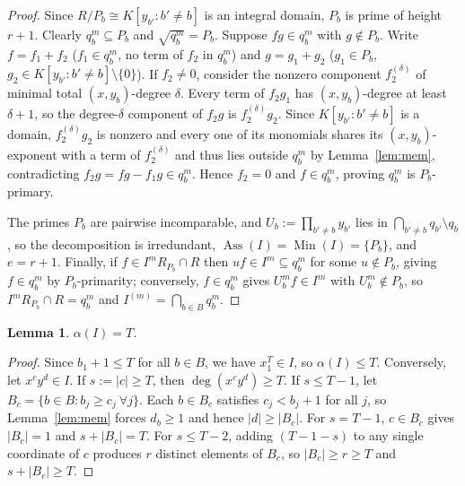 \documentclass[11pt]{article}
\newtheorem{lemma}[theorem]{Lemma}
\newcommand{\Ass}{\operatorname{Ass}}
\newcommand{\Min}{\operatorname{Min}}
\begin{document}
\begin{proof}
Since $R/P_b \cong K[y_{b'} : b' \ne b]$ is an integral domain, $P_b$ is prime of height $r + 1$. Clearly $q_b^m \subseteq P_b$ and $\sqrt{q_b^m} = P_b$. Suppose $fg \in q_b^m$ with $g \notin P_b$. Write $f = f_1 + f_2$ ($f_1 \in q_b^m$, no term of $f_2$ in $q_b^m$) and $g = g_1 + g_2$ ($g_1 \in P_b$, $g_2 \in K[y_{b'} : b' \ne b] \setminus \{0\}$). If $f_2 \ne 0$, consider the nonzero component $f_2^{(\delta)}$ of minimal total $(x, y_b)$-degree $\delta$. Every term of $f_2 g_1$ has $(x, y_b)$-degree at least $\delta + 1$, so the degree-$\delta$ component of $f_2 g$ is $f_2^{(\delta)} g_2$. Since $K[y_{b'} : b' \ne b]$ is a domain, $f_2^{(\delta)} g_2$ is nonzero and every one of its monomials shares its $(x, y_b)$-exponent with a term of $f_2^{(\delta)}$ and thus lies outside $q_b^m$ by Lemma~\ref{lem:mem}, contradicting $f_2 g = fg - f_1 g \in q_b^m$. Hence $f_2 = 0$ and $f \in q_b^m$, proving $q_b^m$ is $P_b$-primary.

The primes $P_b$ are pairwise incomparable, and $U_b := \prod_{b' \ne b} y_{b'}$ lies in $\bigcap_{b' \ne b} q_{b'} \setminus q_b$, so the decomposition is irredundant, $\Ass(I) = \Min(I) = \{P_b\}$, and $e = r + 1$. Finally, if $f \in I^m R_{P_b} \cap R$ then $uf \in I^m \subseteq q_b^m$ for some $u \notin P_b$, giving $f \in q_b^m$ by $P_b$-primarity; conversely, $f \in q_b^m$ gives $U_b^m f \in I^m$ with $U_b^m \notin P_b$, so $I^m R_{P_b} \cap R = q_b^m$ and $I^{(m)} = \bigcap_{b \in B} q_b^m$.
\end{proof}

\begin{lemma}\label{lem:alpha}
$\alpha(I) = T$.
\end{lemma}

\begin{proof}
Since $b_1 + 1 \le T$ for all $b \in B$, we have $x_1^T \in I$, so $\alpha(I) \le T$. Conversely, let $x^c y^d \in I$. If $s := |c| \ge T$, then $\deg(x^c y^d) \ge T$. If $s \le T - 1$, let $B_c = \{b \in B : b_j \ge c_j\ \forall j\}$. Each $b \in B_c$ satisfies $c_j < b_j + 1$ for all $j$, so Lemma~\ref{lem:mem} forces $d_b \ge 1$ and hence $|d| \ge |B_c|$. For $s = T - 1$, $c \in B_c$ gives $|B_c| = 1$ and $s + |B_c| = T$. For $s \le T - 2$, adding $(T - 1 - s)$ to any single coordinate of $c$ produces $r$ distinct elements of $B_c$, so $|B_c| \ge r \ge T$ and $s + |B_c| \ge T$.
\end{proof}
\end{document}
